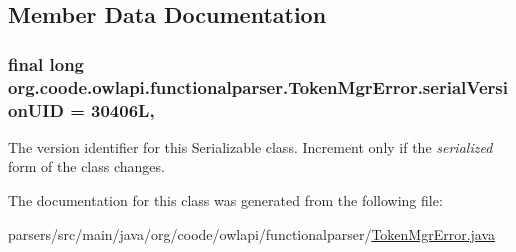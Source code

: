 \subsection{Member Data Documentation}
\hypertarget{classorg_1_1coode_1_1owlapi_1_1functionalparser_1_1_token_mgr_error_a287bbf9de99b41b4e910ad575618ed25}{
\subsubsection[{serial\-Version\-U\-I\-D}]{\setlength{\rightskip}{0pt plus 5cm}final long org.\-coode.\-owlapi.\-functionalparser.\-Token\-Mgr\-Error.\-serial\-Version\-U\-I\-D = 30406\-L\hspace{0.3cm}{\ttfamily [static]}, {\ttfamily [private]}}}\label{classorg_1_1coode_1_1owlapi_1_1functionalparser_1_1_token_mgr_error_a287bbf9de99b41b4e910ad575618ed25}
The version identifier for this Serializable class. Increment only if the {\itshape serialized} form of the class changes. 

The documentation for this class was generated from the following file\-:\begin{DoxyCompactItemize}
\item 
parsers/src/main/java/org/coode/owlapi/functionalparser/\hyperlink{org_2coode_2owlapi_2functionalparser_2_token_mgr_error_8java}{Token\-Mgr\-Error.\-java}\end{DoxyCompactItemize}
